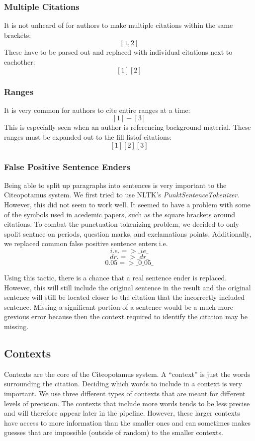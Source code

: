 \documentclass[10pt, conference, compsocconf]{IEEEtran}
\begin{document}
\subsubsection{Multiple Citations}
It is not unheard of for authors to make multiple citations within the same brackets: $$[1, 2]$$
These have to be parsed out and replaced with individual citations next to eachother: $$[1][2]$$

\subsubsection{Ranges}
It is very common for authors to cite entire ranges at a time: $$[1] - [3]$$
This is especially seen when an author is referencing background material. These ranges must be expanded out to
the fill listof citations: $$[1][2][3]$$

\subsubsection{False Positive Sentence Enders}\label{sec:fpEnders}
Being able to split up paragraphs into sentences is very important to the Citeopotamus system.
We first tried to use NLTK's \textit{PunktSentenceTokenizer}. However, this did not seem to work well.
It seemed to have a problem with some of the symbols used in acedemic papers, such as the square brackets around
citations. To combat the punctuation tokenizing problem, we decided to only spolit sentnce on periods, question marks, and
exclamations points. Additionally, we replaced common false positive sentence enters i.e.
$$i.e. => \_ie\_$$
$$dr. => \_dr\_$$
$$0.05 => \_0\_05\_$$

Using this tactic, there is a chance that a real sentence ender is replaced. However, this will still
include the original sentence in the result and the original sentence will still be located closer to the
citation that the incorrectly included sentence. Missing a significant portion of a sentence would be a much more
grevious error because then the context required to identify the citation may be missing.

\subsection{Contexts}\label{sec:context}
Contexts are the core of the Citeopotamus system. A ``context'' is just the words surrounding the citation.
Deciding which words to include in a context is very important. We use three different types of contexts that are meant for different
levels of precision. The contexts that include more words tends to be less precise and will therefore appear later in the pipeline.
However, these larger contexts have access to more information than the smaller ones and can sometimes makes guesses that are impossible
(outside of random) to the smaller contexts.
\end{document}
